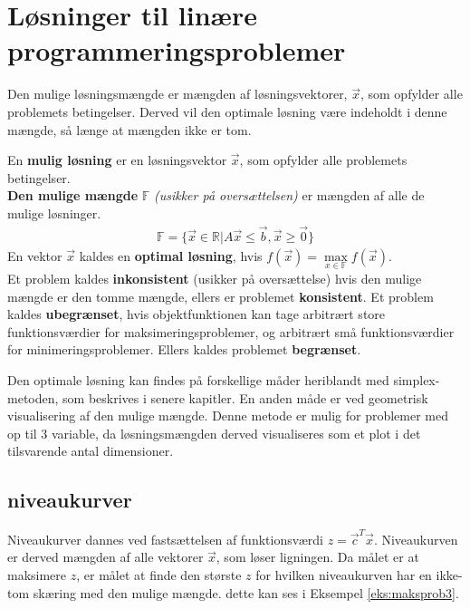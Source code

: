 \section{Løsninger til linære programmeringsproblemer}

Den mulige løsningsmængde er mængden af løsningsvektorer, $\vec{x}$, som opfylder alle problemets betingelser. Derved vil den optimale løsning være indeholdt i denne mængde, så længe at mængden ikke er tom.

\begin{defn}
En \textbf{mulig løsning} er en løsningsvektor $\vec{x}$, som opfylder alle problemets betingelser.\\
\textbf{Den mulige mængde} $\mathds{F}$ \textit{(usikker på oversættelsen)} er mængden af alle de mulige løsninger.
\begin{align*}
\mathds{F}=\{\vec{x} \in \mathds{R}|A\vec{x} \leq \vec{b}, \vec{x} \geq \vec{0}\}
\end{align*}
En vektor $\vec{x}$ kaldes en \textbf{optimal løsning}, hvis $f(\vec{x})=\max\limits_{x \in \mathds{F}}f(\vec{x}).$\\
Et problem kaldes \textbf{inkonsistent} (usikker på oversættelse) hvis den mulige mængde er den tomme mængde, ellers er problemet \textbf{konsistent}. Et problem kaldes \textbf{ubegrænset}, hvis objektfunktionen kan tage arbitrært store funktionsværdier for maksimeringsproblemer, og arbitrært små funktionsværdier for minimeringsproblemer. Ellers kaldes problemet \textbf{begrænset}.
\end{defn}

Den optimale løsning kan findes på forskellige måder heriblandt med simplex-metoden, som beskrives i senere kapitler. En anden måde er ved geometrisk visualisering af den mulige mængde. Denne metode er mulig for problemer med op til 3 variable, da løsningsmængden derved visualiseres som et plot i det tilsvarende antal dimensioner. 

\subsection{niveaukurver}
Niveaukurver dannes ved fastsættelsen af funktionsværdi $z=\vec{c}^T \vec{x}$. Niveaukurven er derved mængden af alle vektorer $\vec{x}$, som løser ligningen. Da målet er at maksimere $z$, er målet at finde den største $z$ for hvilken niveaukurven har en ikke-tom skæring med den mulige mængde. dette kan ses i Eksempel \ref{eks:maksprob3}.



